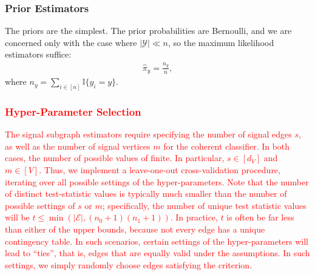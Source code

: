 \documentclass[10pt,journal,cspaper,compsoc]{IEEEtran}
\providecommand{\tr}[1]{\textcolor{red}{#1}}
\newcommand{\II}{\mathbb{I}}           %
\providecommand{\mc}[1]{\mathcal{#1}}
\providecommand{\wh}[1]{\widehat{#1}}
\begin{document}



\subsubsection{Prior Estimators} %
\label{sub:prior_estimators}

The priors are the simplest.  The prior probabilities are Bernoulli, and we are concerned only with the case where $|\mc{Y}| \ll n$, so the maximum likelihood estimators suffice:
\begin{align}
\wh{\pi}_y = \frac{n_y}{n},
\end{align}
where $n_y=\sum_{i \in [n]} \II\{y_i = y\}$.




\tr{\subsubsection{Hyper-Parameter Selection}}

\tr{The signal subgraph estimators require specifying the number of signal edges $s$, as well as the number of signal vertices $m$ for the coherent classifier.  In both cases, the number of possible values of finite.  In particular, $s \in [d_V]$ and $m \in [V]$.  Thus, we implement a leave-one-out cross-validation procedure, iterating over all possible settings of the hyper-parameters.  
% 
Note that the number of distinct test-statistic values is typically much smaller than the number of possible settings of $s$ or $m$; specifically, the number of unique test statistic values will be $t \leq \min(|\mc{E}|,(n_0+1) (n_1+1))$.  In practice, $t$ is often be far less than either of the upper bounds, because not every edge has a unique contingency table. In such scenarios, certain settings of the hyper-parameters will lead to ``ties'', that is, edges that are equally valid under the assumptions.  In such settings, we simply randomly choose edges satisfying the criterion.}

\end{document}
